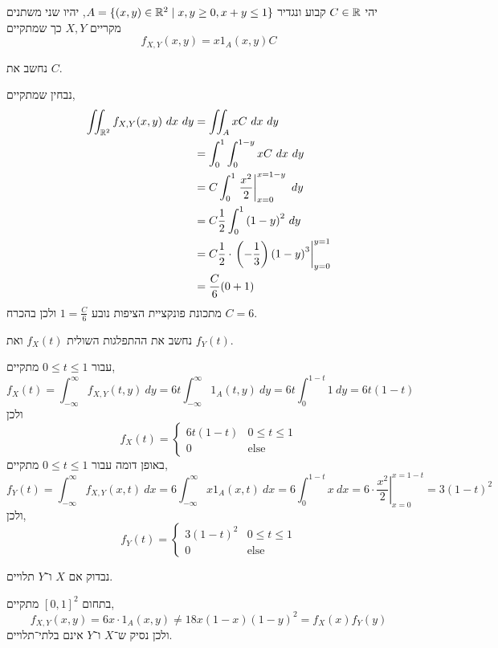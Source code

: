 \question{}
יהי $C \in \mathbb{R}$ קבוע ונגדיר $A = \{ (x, y) \in \mathbb{R}^2 \mid x, y \ge 0, x + y \le 1\}$,
יהיו שני משתנים מקריים $X, Y$ כך שמתקיים
\[
	f_{X, Y}(x, y)
	= x 1_A(x, y) C
\]

\subquestion{}
נחשב את $C$.
\begin{solution}
	נבחין שמתקיים,
	\begin{align*}
		\iint_{\mathbb{R}^2} f_{X, Y}(x, y) \ dx\ dy
		& = \iint_A x C \ dx\ dy \\
		& = \int_0^1 \int_0^{1 - y} x C \ dx\ dy \\
		& = C \int_0^1 \left. \frac{x^2}{2} \right\rvert_{x = 0}^{x = 1 - y}\ dy \\
		& = C \frac{1}{2} \int_0^1 {(1 - y)}^2\ dy \\
		& = C \frac{1}{2} \cdot \left. \left( -\frac{1}{3} \right) {(1 - y)}^3 \right\rvert_{y = 0}^{y = 1} \\
		& = \frac{C}{6} (0 + 1)
	\end{align*}
	מתכונת פונקציית הציפות נובע $1 = \frac{C}{6}$ ולכן בהכרח $C = 6$.
\end{solution}

\subquestion{}
נחשב את ההתפלגות השולית $f_X(t)$ ואת $f_Y(t)$.
\begin{solution}
	עבור $0 \le t \le 1$ מתקיים,
	\[
		f_X(t)
		= \int_{-\infty}^{\infty} f_{X, Y}(t, y) \ dy
		= 6t \int_{-\infty}^{\infty} 1_A(t, y)\ dy
		= 6t \int_0^{1 - t} 1\ dy
		= 6t (1 - t)
	\]
	ולכן
	\[
		f_X(t)
		= \begin{cases}
			6t (1 - t) & 0 \le t \le 1 \\
			0 & \text{else}
		\end{cases}
	\]
	באופן דומה עבור $0 \le t \le 1$ מתקיים,
	\[
		f_Y(t)
		= \int_{-\infty}^{\infty} f_{X, Y}(x, t) \ dx
		= 6 \int_{-\infty}^{\infty} x 1_A(x, t)\ dx
		= 6 \int_0^{1 - t} x\ dx
		= 6 \cdot \left. \frac{x^2}{2} \right\rvert_{x = 0}^{x = 1 - t}
		= 3 {(1 - t)}^2
	\]
	ולכן,
	\[
		f_Y(t)
		= \begin{cases}
			3 {(1 - t)}^2 & 0 \le t \le 1 \\
			0 & \text{else}
		\end{cases}
	\]
\end{solution}

\subquestion{}
נבדוק אם $X$ ו־$Y$ תלויים.
\begin{solution}
	בתחום ${[0, 1]}^2$ מתקיים,
	\[
		f_{X, Y}(x, y)
		= 6x \cdot 1_A(x, y)
		\ne 18x (1 - x) {(1 - y)}^2
		= f_X(x) f_Y(y)
	\]
	ולכן נסיק ש־$X$ ו־$Y$ אינם בלתי־תלויים.
\end{solution}

